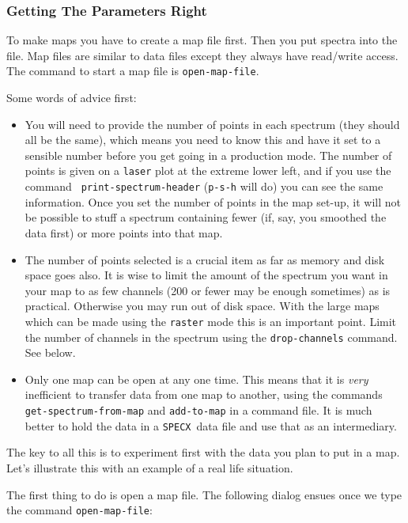 \documentclass[11pt,twoside]{article}
\newcommand{\SPECX}{{\tt SPECX}}
\begin{document}
\subsubsection{Getting The Parameters Right}
\label{sec:specx_13.1}
To make maps you have to create a map file first.  Then you put
spectra into the file.  Map files are similar to data files except
they always have read/write access.  The command to start a map file
is {\tt open-map-file}.

Some words of advice first:
\begin{itemize}
\item
You will need to provide the number of points in each spectrum (they
should all be the same), which means you need to know this and have it
set to a sensible number before you get going in a production
mode. The number of points is given on a {\tt laser} plot at the
extreme lower left, and if you use the command {\tt
print-spectrum-header} ({\tt{p-s-h}} will do) you can see the same
information. Once you set the number of points in the map set-up, it
will not be possible to stuff a spectrum containing fewer (if, say,
you smoothed the data first) or more points into that map.
\item
The number of points selected is a crucial item as far as memory and
disk space goes also. It is wise to limit the amount of the spectrum
you want in your map to as few channels (200 or fewer may be enough
sometimes) as is practical. Otherwise you may run out of disk
space. With the large maps which can be made using the {\tt raster}
mode this is an important point. Limit the number of channels in the
spectrum using the {\tt drop-channels} command. See below.
\item
Only one map can be open at any one time. This means that it is {\it
very} inefficient to transfer data from one map to another, using the
commands
\verb|get-spectrum-from-map| and {\tt add-to-map} in a command file. It is
much better to hold the data in a \SPECX\ data file and use that as an
intermediary.
\end{itemize}

The key to all this is to experiment first with the data you plan to
put in a map. Let's illustrate this with an example of a real life
situation.

The first thing to do is open a map file. The following dialog ensues once we
type the command {\tt open-map-file}:
\end{document}
